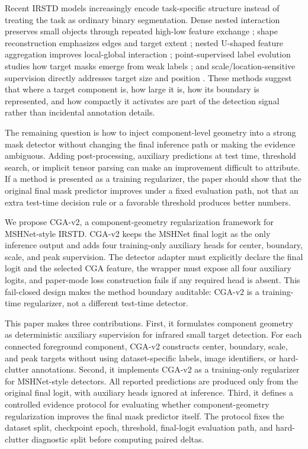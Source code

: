 \documentclass[letterpaper]{article}
\begin{document}
Recent IRSTD models increasingly encode task-specific structure instead of treating the task as ordinary binary segmentation. Dense nested interaction preserves small objects through repeated high-low feature exchange \citep{li2023dnanet}; shape reconstruction emphasizes edges and target extent \citep{zhang2022isnet}; nested U-shaped feature aggregation improves local-global interaction \citep{wu2023uiunet}; point-supervised label evolution studies how target masks emerge from weak labels \citep{ying2023lesps}; and scale/location-sensitive supervision directly addresses target size and position \citep{liu2024sls}. These methods suggest that where a target component is, how large it is, how its boundary is represented, and how compactly it activates are part of the detection signal rather than incidental annotation details.

The remaining question is how to inject component-level geometry into a strong mask detector without changing the final inference path or making the evidence ambiguous. Adding post-processing, auxiliary predictions at test time, threshold search, or implicit tensor parsing can make an improvement difficult to attribute. If a method is presented as a training regularizer, the paper should show that the original final mask predictor improves under a fixed evaluation path, not that an extra test-time decision rule or a favorable threshold produces better numbers.

We propose CGA-v2, a component-geometry regularization framework for MSHNet-style IRSTD. CGA-v2 keeps the MSHNet final logit as the only inference output and adds four training-only auxiliary heads for center, boundary, scale, and peak supervision. The detector adapter must explicitly declare the final logit and the selected CGA feature, the wrapper must expose all four auxiliary logits, and paper-mode loss construction fails if any required head is absent. This fail-closed design makes the method boundary auditable: CGA-v2 is a training-time regularizer, not a different test-time detector.

This paper makes three contributions. First, it formulates component geometry as deterministic auxiliary supervision for infrared small target detection. For each connected foreground component, CGA-v2 constructs center, boundary, scale, and peak targets without using dataset-specific labels, image identifiers, or hard-clutter annotations. Second, it implements CGA-v2 as a training-only regularizer for MSHNet-style detectors. All reported predictions are produced only from the original final logit, with auxiliary heads ignored at inference. Third, it defines a controlled evidence protocol for evaluating whether component-geometry regularization improves the final mask predictor itself. The protocol fixes the dataset split, checkpoint epoch, threshold, final-logit evaluation path, and hard-clutter diagnostic split before computing paired deltas.
\end{document}
